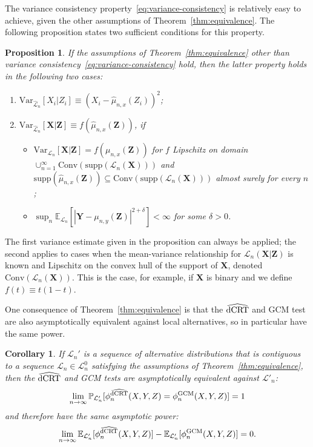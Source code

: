 \documentclass[aos]{imsart}
\theoremstyle{plain}
\newtheorem{proposition}{Proposition}
\newtheorem{corollary}{Corollary}
\theoremstyle{remark}
\newcommand{\E}{\mathbb E}								%
\newcommand{\V}{\mathrm{Var}}							%
\renewcommand{\P}{\mathbb{P}}							%
\newcommand{\prx}{\bm X}								%
\newcommand{\srx}{X}									%
\newcommand{\prz}{\bm Z}								%
\newcommand{\srz}{Z}									%
\newcommand{\pry}{{\bm Y}}								%
\newcommand{\sry}{Y}									%
\newcommand{\law}{\mathcal L}							%
\newcommand{\nulllaws}{\mathscr L^0}					%
\newcommand{\lawhat}{\widehat{\mathcal L}}				%
\newcommand{\GCM}{\textnormal{GCM}}						%
\newcommand{\dCRThat}{\widehat{\textnormal{dCRT}}}		%
\begin{document}
The variance consistency property~\eqref{eq:variance-consistency} is relatively easy to achieve, given the other assumptions of Theorem~\ref{thm:equivalence}. The following proposition states two sufficient conditions for this property.

\begin{proposition} \label{prop:sufficient-for-variance-consistency} 
    If the assumptions of Theorem~\ref{thm:equivalence} other than variance consistency~\eqref{eq:variance-consistency} hold, then the latter property holds in the following two cases:
    \begin{enumerate}
        \item $\V_{\lawhat_n}[\srx_i|\srz_i] \equiv (\srx_i - \widehat \mu_{n,x}(\srz_i))^2$;
        \item $\V_{\lawhat_n}[\prx|\prz] \equiv f(\widehat \mu_{n,x}(\prz))$, if 
        \begin{itemize}
            \item $\V_{\law_n}[\prx|\prz] = f(\mu_{n,x}(\prz))$ for $f$ Lipschitz on domain $\cup_{n=1}^{\infty}\mathrm{Conv}(\mathrm{supp}(\law_{n}(\prx)))$ and $\mathrm{supp}(\widehat \mu_{n,x}(\prz))\subseteq\mathrm{Conv}(\mathrm{supp}(\law_{n}(\prx)))$ almost surely for every $n$;
            \item $\sup_n \E_{\law_n}[|\pry-\mu_{n,y}(\prz)|^{2+\delta}] < \infty$ for some $\delta > 0$.
        \end{itemize}
    \end{enumerate} 
\end{proposition}

The first variance estimate given in the proposition can always be applied; the second applies to cases when the mean-variance relationship for $\law_n(\prx|\prz)$ is known and Lipschitz on the convex hull of the support of $\prx$, denoted $\mathrm{Conv}(\law_{n}(\prx))$. This is the case, for example, if $\prx$ is binary and we define $f(t) \equiv t(1-t)$.

One consequence of Theorem~\ref{thm:equivalence} is that the $\dCRThat$ and GCM test are also asymptotically equivalent against local alternatives, so in particular have the same power.

\begin{corollary} \label{cor:asymptotic-equivalence-alternative}
    If $\law_n'$ is a sequence of alternative distributions that is contiguous to a sequence $\law_n \in \nulllaws_n$ satisfying the assumptions of Theorem~\ref{thm:equivalence}, then the $\dCRThat$ and GCM tests are asymptotically equivalent against $\law'_n$:
    \begin{equation}
        \lim_{n \rightarrow \infty} \P_{\law_n'}[\phi^{\dCRThat}_{n}(\srx, \sry, \srz) = \phi^{\GCM}_{n}(\srx, \sry, \srz)] = 1
        \label{eq:equivalent-tests-alternative}
    \end{equation}
    and therefore have the same asymptotic power:
    \begin{equation}
        \lim_{n \rightarrow \infty} \E_{\law'_n}[\phi_n^{\dCRThat}(\srx, \sry, \srz)] - \E_{\law'_n}[\phi_n^{\GCM}(\srx, \sry, \srz)] = 0.
    \end{equation}
\end{corollary}
\end{document}
